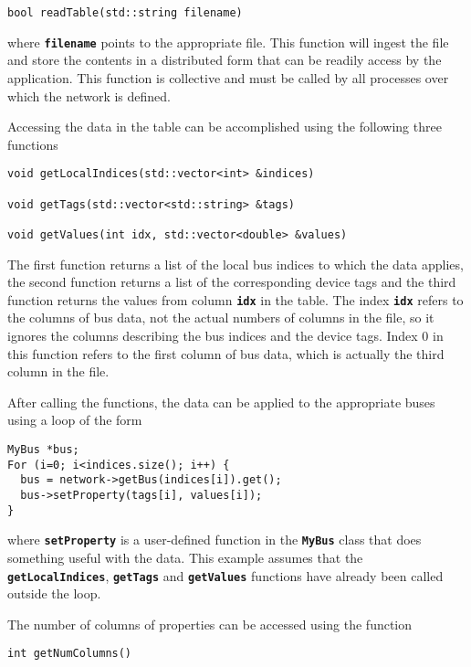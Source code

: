 {
\color{red}
\begin{Verbatim}[fontseries=b]
bool readTable(std::string filename)
\end{Verbatim}
}

where \texttt{\textbf{filename}} points to the appropriate file. This function will ingest the file and store the contents in a distributed form that can be readily access by the application. This function is collective and must be called by all processes over which the network is defined.

Accessing the data in the table can be accomplished using the following three functions

{
\color{red}
\begin{Verbatim}[fontseries=b]
void getLocalIndices(std::vector<int> &indices)

void getTags(std::vector<std::string> &tags)

void getValues(int idx, std::vector<double> &values)
\end{Verbatim}
}

The first function returns a list of the local bus indices to which the data applies, the second function returns a list of the corresponding device tags and the third function returns the values from column \texttt{\textbf{idx}} in the table.
The index \texttt{\textbf{idx}} refers to the columns of bus data, not the
actual numbers of columns in the file, so it ignores the columns describing the
bus indices and the device tags. Index 0 in this function refers to the first
column of bus data, which is actually the third column in the file.

After calling the functions, the data can be applied to the appropriate buses using a loop of the form

{
\color{red}
\begin{Verbatim}[fontseries=b]
MyBus *bus;
For (i=0; i<indices.size(); i++) {
  bus = network->getBus(indices[i]).get();
  bus->setProperty(tags[i], values[i]);
}
\end{Verbatim}
}

where \texttt{\textbf{setProperty}} is a user-defined function in the
\texttt{\textbf{MyBus}} class that does something useful with the data. This
example assumes that the \texttt{\textbf{getLocalIndices}},
\texttt{\textbf{getTags}} and \texttt{\textbf{getValues}} functions have already been called outside the loop.

The number of columns of properties can be accessed using the function

{
\color{red}
\begin{Verbatim}[fontseries=b]
int getNumColumns()
\end{Verbatim}
}
